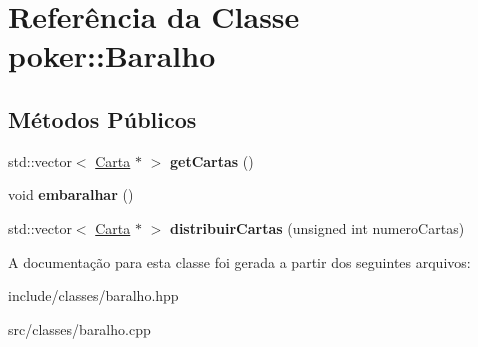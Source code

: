 \hypertarget{classpoker_1_1Baralho}{}\section{Referência da Classe poker\+:\+:Baralho}
\label{classpoker_1_1Baralho}
\subsection*{Métodos Públicos}
\begin{DoxyCompactItemize}
\item 
\mbox{\label{classpoker_1_1Baralho_a3abc3b02347af488501a8b55b8e8ca30}} 
std\+::vector$<$ \hyperlink{classpoker_1_1Carta}{Carta} $\ast$ $>$ {\bfseries get\+Cartas} ()
\item 
\mbox{\label{classpoker_1_1Baralho_a702ae6b1313a49896f202ab6eec709a8}} 
void {\bfseries embaralhar} ()
\item 
\mbox{\label{classpoker_1_1Baralho_a99afb888d1980bee698044d14a35b856}} 
std\+::vector$<$ \hyperlink{classpoker_1_1Carta}{Carta} $\ast$ $>$ {\bfseries distribuir\+Cartas} (unsigned int numero\+Cartas)
\end{DoxyCompactItemize}


A documentação para esta classe foi gerada a partir dos seguintes arquivos\+:\begin{DoxyCompactItemize}
\item 
include/classes/baralho.\+hpp\item 
src/classes/baralho.\+cpp\end{DoxyCompactItemize}
